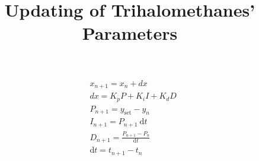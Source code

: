 \documentclass[12pt,letterpaper]{article}
\title{Updating of Trihalomethanes' Parameters}
\begin{document}
	
		
	\begin{align*}
		&x_{n+1} = x_n + dx \\
		&dx = K_p P + K_i I + K_d D \\
		&P_{n+1} = y_{\text{set}} - y_n \\
		&I_{n+1} = P_{n+1} \ \mathrm{d}t \\
		&D_{n+1} = \frac{P_{n+1} - P_n}{\mathrm{d}t} \\
		&\mathrm{d}t = t_{n+1} - t_n
	\end{align*}
\end{document}
